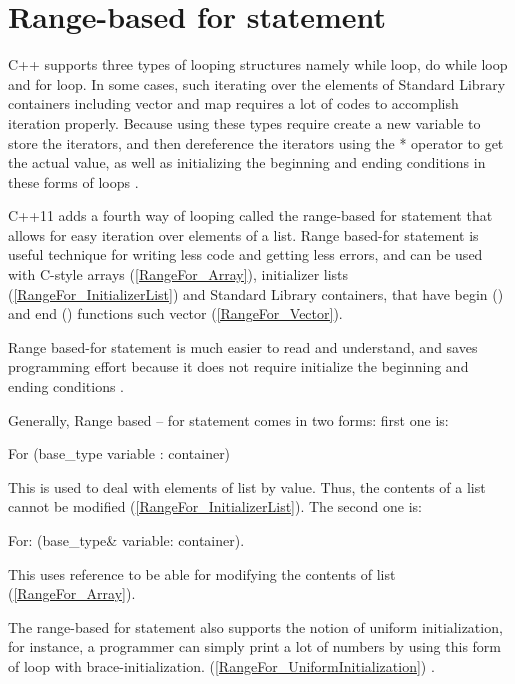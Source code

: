 \documentclass[11pt]{report}
\begin{document}
\section{Range-based for statement}
\label{section: Range-based for statement}
C++ supports three types of looping structures namely while loop, do while loop and for loop. In some cases, such iterating over the elements of Standard Library containers including vector and map requires a lot of codes to accomplish iteration properly. Because using these types require create a new variable to store the iterators, and then dereference the iterators using the * operator to get the actual value, as well as initializing the beginning and ending conditions in these forms of loops \cite{Horstmann:2008:BC}.


C++11 adds a fourth way of looping called the range-based for statement that allows for easy iteration over elements of a list. Range based-for statement is useful technique for writing less code and getting less errors, and can be used with C-style arrays (\ref{RangeFor_Array}), initializer lists (\ref{RangeFor_InitializerList}) and Standard Library containers, that have begin () and end () functions such vector (\ref{RangeFor_Vector}). 


Range based-for statement is much easier to read and understand, and saves programming effort because it does not require initialize the beginning and ending conditions \cite{Overland:2011:CWF}.


Generally, Range based – for statement comes in two forms: first one is:
\begin{center}
For (base\_type  variable : container)
\end{center} 

This is used to deal with elements of list by value. Thus, the contents of a list cannot be modified (\ref{RangeFor_InitializerList}). The second one is:
\begin{center}
For: (base\_type\& variable: container).
\end{center}

This uses reference to be able for modifying the contents of list (\ref{RangeFor_Array}).


The range-based for statement also supports the notion of uniform initialization, for instance, a programmer can simply print a lot of numbers by using this form of loop with brace-initialization. (\ref{RangeFor_UniformInitialization}) \cite{Overland:2011:CWF}.

\end{document}
